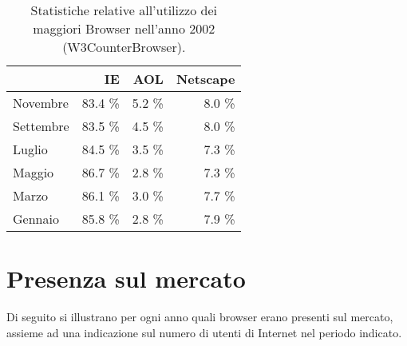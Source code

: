 \begin{table}
\begin{center}
\begin{tabular}{||p{4cm}|*{3}{r|}|}
	\hline
	\centering {\bfseries 2002}  & IE & AOL & Netscape \\
	\hline
	\hline
	Novembre & 83.4 \% & 5.2 \% & 8.0 \% \\
	\hline
	Settembre & 83.5 \% & 4.5 \% & 8.0 \% \\
	\hline
	Luglio & 84.5 \% & 3.5 \% & 7.3 \% \\
	\hline
	Maggio & 86.7 \% & 2.8 \% & 7.3 \% \\
	\hline
	Marzo & 86.1 \% & 3.0 \% & 7.7 \% \\
	\hline
	Gennaio & 85.8 \% & 2.8 \% & 7.9 \% \\
	\hline
\end{tabular}
 \caption{Statistiche relative all'utilizzo dei maggiori Browser nell'anno 2002 (W3CounterBrowser).}
 \label{tab:brow_stats_2002}
\end{center}
\end{table}







\newpage




\section{Presenza sul mercato} %
\label{sec:presenza_sul_mercato}

Di seguito si illustrano per ogni anno quali browser erano presenti sul mercato, assieme ad una indicazione sul numero di utenti di Internet nel  periodo indicato.


